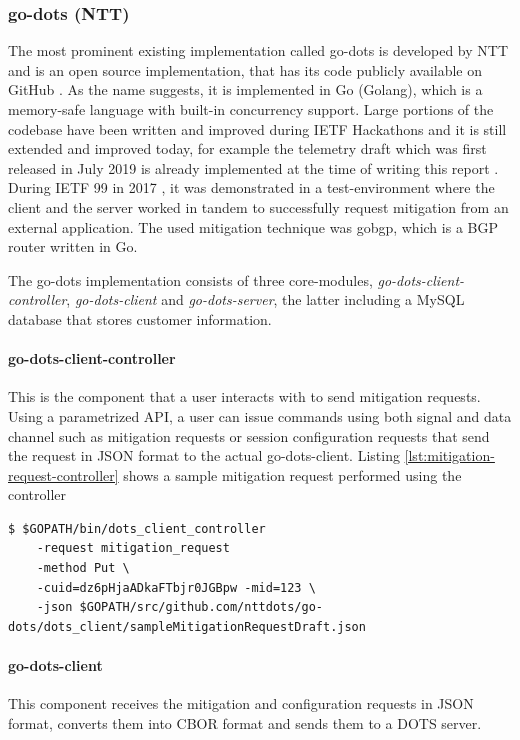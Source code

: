 \subsubsection{go-dots (NTT)}
The most prominent existing implementation called go-dots is developed by NTT and is an open source implementation, that has its code publicly available on GitHub \cite{go-dots-github}. As the name suggests, it is implemented in Go (Golang), which is a memory-safe language with built-in concurrency support. Large portions of the codebase have been written and improved during IETF Hackathons \cite{interop-100, interop-101} and it is still extended and improved today, for example the telemetry draft which was first released in July 2019 \cite{telemetry-draft} is already implemented at the time of writing this report \cite{hackathon-106}. During IETF 99 in 2017 \cite{hackathon-99}, it was demonstrated in a test-environment where the client and the server worked in tandem to successfully request mitigation from an external application. The used mitigation technique was gobgp, which is a BGP router written in Go.

The go-dots implementation consists of three core-modules, \emph{go-dots-client-controller}, \emph{go-dots-client} and \emph{go-dots-server}, the latter including a MySQL database that stores customer information.

\paragraph{go-dots-client-controller}This is the component that a user interacts with to send mitigation requests. Using a parametrized API, a user can issue commands using both signal and data channel such as mitigation requests or session configuration requests that send the request in JSON format to the actual go-dots-client. Listing \ref{lst:mitigation-request-controller} shows a sample mitigation request performed using the controller

\begin{lstlisting}[caption={Sample mitigation request using go-dots-client-controller},label={lst:mitigation-request-controller}]
$ $GOPATH/bin/dots_client_controller 
    -request mitigation_request 
    -method Put \
    -cuid=dz6pHjaADkaFTbjr0JGBpw -mid=123 \
    -json $GOPATH/src/github.com/nttdots/go-dots/dots_client/sampleMitigationRequestDraft.json
\end{lstlisting}

\paragraph{go-dots-client}This component receives the mitigation and configuration requests in JSON format, converts them into CBOR format and sends them to a DOTS server.

